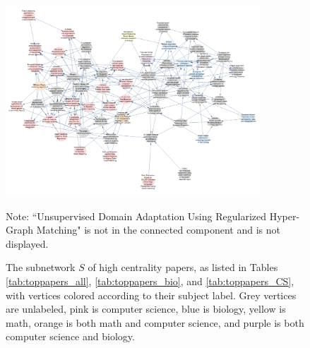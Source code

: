 \documentclass[12pt]{thesis}
\theoremstyle{plain}
\theoremstyle{definition}
\theoremstyle{remark}
\begin{document}
\begin{figure}
\centering
\includegraphics[width=0.85\textwidth]{reading_list_subject_colored_CROPPED.png}
\caption{The subnetwork $S$ of high centrality papers, as listed in Tables \ref{tab:toppapers_all}, \ref{tab:toppapers_bio}, and \ref{tab:toppapers_CS}, with vertices colored according to their subject label. Grey vertices are unlabeled, pink is computer science, blue is biology, yellow is math, orange is both math and computer science, and purple is both computer science and biology.}
\vspace{-12pt}\flushleft\scriptsize Note: ``Unsupervised Domain Adaptation Using Regularized Hyper-Graph Matching" is not in the connected component and is not displayed.
\label{fig:reading_list_subject_colored}
\end{figure}
\end{document}
